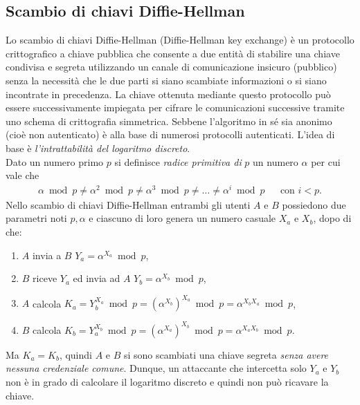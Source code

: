 \subsection{Scambio di chiavi Diffie-Hellman}
Lo scambio di chiavi Diffie-Hellman (Diffie-Hellman key exchange) è un protocollo crittografico a chiave pubblica che consente a due entità di stabilire una chiave condivisa e segreta utilizzando un canale di comunicazione insicuro (pubblico) senza la necessità che le due parti si siano scambiate informazioni o si siano incontrate in precedenza. La chiave ottenuta mediante questo protocollo può essere successivamente impiegata per cifrare le comunicazioni successive tramite uno schema di crittografia simmetrica. Sebbene l'algoritmo in sé sia anonimo (cioè non autenticato) è alla base di numerosi protocolli autenticati. L'idea di base è \textit{l'intrattabilità del logaritmo discreto}.\\
Dato un numero primo $p$ si definisce \textit{radice primitiva di} $p$ un numero $\alpha$ per cui vale che
\begin{align*}
\alpha\bmod p \neq \alpha^2\bmod p \neq \alpha^3\bmod p \neq \dots \neq \alpha^i\bmod p && \text{con } i < p.
\end{align*}
Nello scambio di chiavi Diffie-Hellman entrambi gli utenti $A$ e $B$ possiedono due parametri noti $p, \alpha$ e ciascuno di loro genera un numero casuale $X_a$ e $X_b$, dopo di che:
\begin{enumerate}
	\item $A$ invia a $B$ $Y_a=\alpha^{X_a}\bmod p$,
	\item $B$ riceve $Y_a$ ed invia ad $A$ $Y_b=\alpha^{X_b}\bmod p$,
	\item $A$ calcola $K_a=Y_b^{X_a}\bmod p = (\alpha^{X_b})^{X_a}\bmod p = \alpha^{X_b X_a}\bmod p$,
	\item $B$ calcola $K_b=Y_a^{X_b}\bmod p = (\alpha^{X_a})^{X_b}\bmod p = \alpha^{X_a X_b}\bmod p$.
\end{enumerate}
Ma $K_a = K_b$, quindi $A$ e $B$ si sono scambiati una chiave segreta \textit{senza avere nessuna credenziale comune}. Dunque, un attaccante che intercetta solo $Y_a$ e $Y_b$ non è in grado di calcolare il logaritmo discreto e quindi non può ricavare la chiave.

